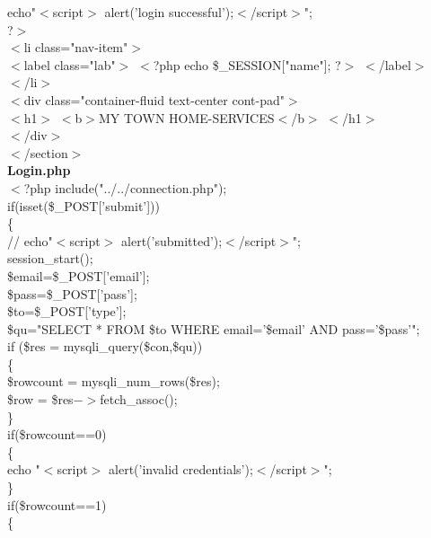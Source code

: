 \documentclass[12pt,a4paper]{report}
\begin{document}
\begin{titlepage}
{                            echo"$<$script$>$ alert('login successful');$<$/script$>$";\\
                            ?$>$\\
					        $<$li class="nav-item"$>$\\
        $<$label class="lab"$>$ $<$?php echo \$\_SESSION["name"]; ?$>$ $<$/label$>$\\
        $<$/li$>$\\
       
                $<$div class="container-fluid text-center cont-pad"$>$\\
                   
			$<$h1$>$ $<$b$>$MY TOWN HOME-SERVICES$<$/b$>$ $<$/h1$>$\\

        $<$/div$>$\\
$<$/section$>$\\
\newpage
\textbf{Login.php }\\
\vspace{0.5cm}
$<$?php include("../../connection.php");\\
if(isset(\$\_POST['submit']))\\
\{\\
  //  echo"$<$script$>$ alert('submitted');$<$/script$>$";\\
            session\_start();\\
            \$email=\$\_POST['email'];\\
            \$pass=\$\_POST['pass'];\\
            \$to=\$\_POST['type'];\\
          
            \$qu="SELECT * FROM \$to WHERE email='\$email' AND pass='\$pass'";\\
                
            if (\$res = mysqli\_query(\$con,\$qu))\\
            \{\\
                \$rowcount = mysqli\_num\_rows(\$res);\\
                \$row = \$res$->$fetch\_assoc();\\
            \}\\
            if(\$rowcount==0)\\
            \{\\ 
                    echo "$<$script$>$ alert('invalid credentials');$<$/script$>$";\\
            \}\\
            if(\$rowcount==1)\\
            \{\\
                
}
\end{titlepage}
\end{document}
